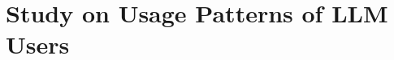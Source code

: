\section{Study on Usage Patterns of LLM Users}
\label{sec:study-on-usage-patterns-of-llm-users}




%